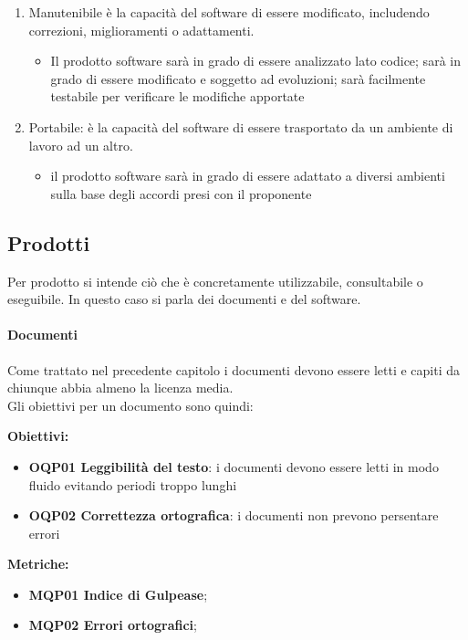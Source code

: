 \documentclass[../piano_di_qualifica.tex]{subfiles}
\begin{document}
\begin{enumerate}
\begin{itemize}
	\end{itemize}
\item Manutenibile è la capacità del software di essere modificato, includendo correzioni, miglioramenti o adattamenti.
	\begin{itemize}
	\item Il prodotto software sarà in grado di essere analizzato lato codice; sarà in grado di essere modificato e soggetto ad evoluzioni; sarà facilmente testabile per verificare le modifiche apportate
	\end{itemize}
\item Portabile: è la capacità del software di essere trasportato da un ambiente di lavoro ad un altro.
	\begin{itemize}
	\item il prodotto software sarà in grado di essere adattato a diversi ambienti sulla base degli accordi presi con il proponente
	\end{itemize}
\end{enumerate}

\subsection{Prodotti}
Per prodotto si intende ciò che è concretamente utilizzabile, consultabile o eseguibile. In questo caso si parla dei documenti e del software.

\paragraph{Documenti}
Come trattato nel precedente capitolo i documenti devono essere letti e capiti da chiunque abbia almeno la licenza media.\\
Gli obiettivi per un documento sono quindi:

\textbf{Obiettivi:}
\smallbreak
\begin{itemize}
\item \textbf{OQP01 Leggibilità del testo}: i documenti devono essere letti in modo fluido evitando periodi troppo lunghi
\item \textbf{OQP02 Correttezza ortografica}: i documenti non prevono persentare errori
\end{itemize}

\textbf{Metriche:}
\smallbreak
\begin{itemize}
	\item \textbf{MQP01 Indice di Gulpease};
	\item \textbf{MQP02 Errori ortografici};
\end{itemize}
\end{document}
